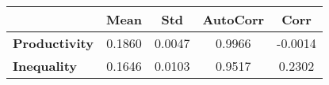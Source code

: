 \begin{tiny}\begin{tabular}{|l|c|c|c|c|}
\hline
&\textbf{Mean}&\textbf{Std}&\textbf{AutoCorr}&\textbf{Corr}\\\hline
\textbf{Productivity}&0.1860&0.0047&0.9966&-0.0014\\\hline
\textbf{Inequality}&0.1646&0.0103&0.9517&0.2302\\\hline
\end{tabular}
\end{tiny}